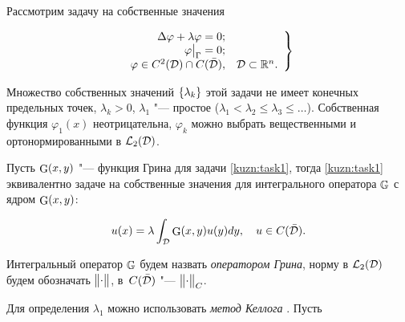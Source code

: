 \maketitle




Рассмотрим задачу на собственные значения

\begin{gather}

    \left.\begin{array}{rl}

        \Delta\varphi+\lambda\varphi=0;\\

        \varphi\bigr|_\Gamma=0;\\

        \varphi\in C^2(\D)\cap C(\bar \D), &

        \D\subset\mathbb{R}^n.

    \end{array}

    \right\}

\label{kuzn:task1}    

\end{gather}



Множество собственных значений $\left\{\lambda_k\right\}$ этой задачи не имеет конечных предельных точек, $\lambda_k>0$, $\lambda_1$ "--- простое ($\lambda_1<\lambda_2\leqslant\lambda_3\leqslant\ldots$). Собственная функция $\varphi_1(x)$ неотрицательна, $\varphi_k$ можно выбрать вещественными и ортонормированными в $\mathcal{L}_2(\mathcal{D})$.



Пусть $\mathop{\rm G}\nolimits(x, y)$ "--- функция Грина для задачи \eqref{kuzn:task1}, тогда \eqref{kuzn:task1} эквивалентно задаче на собственные значения для интегрального оператора $\mathop{\mathbb{G}}\nolimits$ с ядром $\mathop{\rm G}\nolimits(x, y)$:

\[

u(x)=\lambda\int_{\D}\Green(x, y)u(y)dy, \quad 

        u\in C(\bar\D).

\]



Интегральный оператор $\mathop{\mathbb{G}}\nolimits$ будем назвать \emph{оператором Грина}, норму в $\mathcal{L}_2(\mathcal{D})$ будем обозначать $\bigl\|{\cdot}\bigr\|$, в~$C(\bar {\mathcal{D}})$ "--- $\bigl\|{\cdot}\bigr\|_C$.



Для определения $\lambda_1$ можно использовать \emph{метод Келлога} \cite{kuzn:Vladimirov}. Пусть \linebreak

